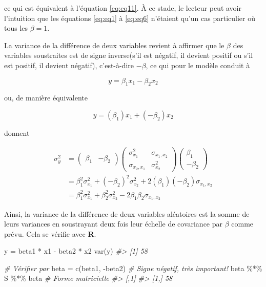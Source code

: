 \documentclass[
]{book}
\newenvironment{Shaded}{}{}
\newcommand{\CommentTok}[1]{\textit{#1}}
\newcommand{\FunctionTok}[1]{#1}
\newcommand{\NormalTok}[1]{#1}
\newcommand{\OtherTok}[1]{#1}
\newcommand{\SpecialCharTok}[1]{#1}
\begin{document}
ce qui est équivalent à l'équation \eqref{eq:eq11}. À ce stade, le lecteur peut avoir l'intuition que les équations \eqref{eq:eq1} à \eqref{eq:eq6} n'étaient qu'un cas particulier où tous les \(\beta=1\).

La variance de la différence de deux variables revient à affirmer que le \(\beta\) des variables soustraites est de signe inverse(s'il est négatif, il devient positif ou s'il est positif, il devient négatif), c'est-à-dire \(-\beta\), ce qui pour le modèle conduit à

\[
y=\beta_1 x_1-\beta_2 x_2
\]

ou, de manière équivalente

\[
y=(\beta_1) x_1+(-\beta_2) x_2
\]

donnent

\begin{equation}
\begin{aligned}
\sigma_y^2 &= 
\left(\begin{array}{cc} 
\beta_1 & -\beta_2 
\end{array}\right) 
\left( \begin{array}{cc}
\sigma^2_{x_1} & \sigma_{x_1,x_2} \\
\sigma_{x_2,x_1} & \sigma^2_{x_2} 
\end{array} 
\right)
\left(\begin{array}{c} \beta_1 \\ -\beta_2 \end{array} \right) \\[15pt]
& = \beta_1^2 \sigma_{x_1}^2+(-\beta_2)^2 \sigma^2_{x_2} + 2(\beta_1)(-\beta_2)\sigma_{x_1,x_2} \\[15pt]
& = \beta_1^2 \sigma_{x_1}^2+\beta_2^2 \sigma^2_{x_2} - 2\beta_1\beta_2\sigma_{x_1,x_2}
\end{aligned}
\label{eq:eq16} 
\end{equation}

Ainsi, la variance de la différence de deux variables aléatoires est la somme de leurs variances en soustrayant deux fois leur échelle de covariance par \(\beta\) comme prévu. Cela se vérifie avec \textbf{R}.

\begin{Shaded}
\begin{Highlighting}[]
\NormalTok{y }\OtherTok{=}\NormalTok{ beta1 }\SpecialCharTok{*}\NormalTok{ x1 }\SpecialCharTok{{-}}\NormalTok{ beta2 }\SpecialCharTok{*}\NormalTok{ x2}
\FunctionTok{var}\NormalTok{(y)}
\CommentTok{\#\textgreater{} [1] 58}

\CommentTok{\# Vérifier par}
\NormalTok{beta }\OtherTok{=} \FunctionTok{c}\NormalTok{(beta1, }\SpecialCharTok{{-}}\NormalTok{beta2)   }\CommentTok{\# Signe négatif, très important!}
\NormalTok{beta }\SpecialCharTok{\%*\%}\NormalTok{ S }\SpecialCharTok{\%*\%}\NormalTok{ beta       }\CommentTok{\# Forme matricielle}
\CommentTok{\#\textgreater{}      [,1]}
\CommentTok{\#\textgreater{} [1,]   58}
\end{Highlighting}
\end{Shaded}
\end{document}
